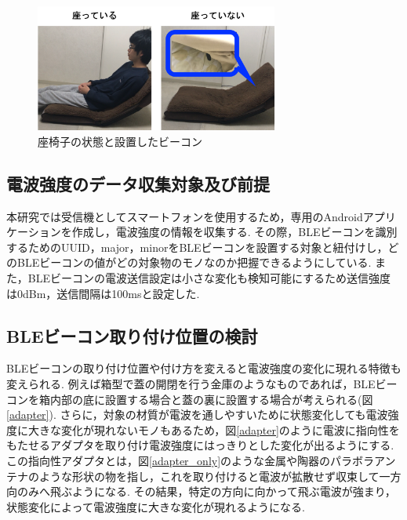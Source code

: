 \documentclass[Japanese]{dicomopapers}
\begin{document}
\begin{figure}[tbh]
    \centering
    \includegraphics[width=8cm]{zaisuW.png}
    \caption{座椅子の状態と設置したビーコン}
    \label{chair}
\end{figure}





\subsection{電波強度のデータ収集対象及び前提}

本研究では受信機としてスマートフォンを使用するため，専用のAndroidアプリケーションを作成し，電波強度の情報を収集する.
その際，BLEビーコンを識別するためのUUID，major，minorをBLEビーコンを設置する対象と紐付けし，どのBLEビーコンの値がどの対象物のモノなのか把握できるようにしている.
また，BLEビーコンの電波送信設定は小さな変化も検知可能にするため送信強度は0dBm，送信間隔は100msと設定した.




\subsection{BLEビーコン取り付け位置の検討}
BLEビーコンの取り付け位置や付け方を変えると電波強度の変化に現れる特徴も変えられる.
例えば箱型で蓋の開閉を行う金庫のようなものであれば，BLEビーコンを箱内部の底に設置する場合と蓋の裏に設置する場合が考えられる(図\ref{adapter}).
さらに，対象の材質が電波を通しやすいために状態変化しても電波強度に大きな変化が現れないモノもあるため，図\ref{adapter}のように電波に指向性をもたせるアダプタを取り付け電波強度にはっきりとした変化が出るようにする.
この指向性アダプタとは，図\ref{adapter_only}のような金属や陶器のパラボラアンテナのような形状の物を指し，これを取り付けると電波が拡散せず収束して一方向のみへ飛ぶようになる.
その結果，特定の方向に向かって飛ぶ電波が強まり，状態変化によって電波強度に大きな変化が現れるようになる.
\end{document}
